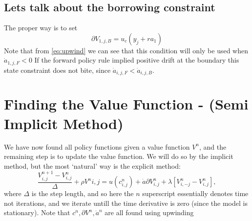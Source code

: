 \documentclass[12pt]{article}
\DeclareMathOperator{\1}{\mathbbm{1}}
\begin{document}
	\subsection{Lets talk about the borrowing constraint}
	The proper way is to set 
	\begin{equation*}
		\partial V_{1,j,B} = u_c(y_j + r a_1)
	\end{equation*}
	Note that from \eqref{eq:upwind} we can see that this condition will only be used when $\dot a_{1,j,F}<0$ If the forward policy rule implied positive drift at the boundary this state constraint does not bite, since $\dot a_{i,j,F}<\dot a_{i,j,B}$.
	
	
	
\section{Finding the Value Function - (Semi Implicit Method)}
We have now found all policy functions given a value function $V^n$, and the remaining step is to update the value function. We will do so by the implicit method, but the most `natural' way is the explicit method:
\begin{equation}
\frac{V^{n+1}_{i,j} - V^n_{i,j}}\Delta + \rho V^n{i,j} =u(c^n_{i,j}) + \dot a \partial V^n_{i,j} + \lambda [V^n_{i,-j} - V^n_{i,j}],
\end{equation}
where $\Delta$ is the step length, and so here the $n$ superscript essentially denotes time not iterations, and we iterate untill the time derivative is zero (since the model is stationary). Note that $c^n,\partial V^n, \dot a^n$ are all found using upwinding
\end{document}
